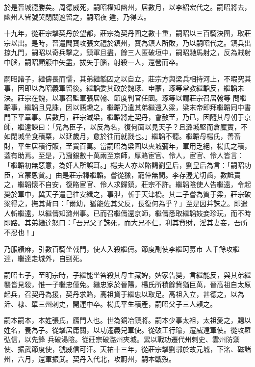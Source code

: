 \begin{pinyinscope}
 於是晉城德勝矣。周德威死，嗣昭權知幽州，居數月，以李紹宏代之。嗣昭將去，幽州人皆號哭閉關遮留之，嗣昭夜
 遁，乃得去。



 十九年，從莊宗擊契丹於望都，莊宗為契丹圍之數十重，嗣昭以三百騎決圍，取莊宗以出。是時，晉遣閻寶攻張文禮於鎮州，寶為鎮人所敗，乃以嗣昭代之。鎮兵出掠九門，嗣昭以奇兵擊之，鎮軍且盡，餘三人匿破垣中，嗣昭馳馬射之，反為賊射中腦，嗣昭顧箙中矢盡，拔矢于腦，射殺一人，還營而卒。



 嗣昭諸子，繼儔長而懦，其弟繼韜囚之以自立，莊宗方與梁兵相持河上，不暇究其事，因即以為昭義軍留後。繼韜委其政於魏琢、申蒙，琢等常教繼韜反，繼韜未決。莊宗在魏，以事召監軍張居翰、節度判官任圜。琢等以謂莊宗召居翰等
 問繼韜事，繼韜且見誅，因以語趣之，繼韜乃遣其弟繼遠入梁，梁末帝即拜繼韜同中書門下平章事。居數月，莊宗滅梁，繼韜將走契丹，會赦至，乃已，因隨其母朝于京師，繼遠諫曰：「兄為臣子，以反為名，復何面以見天子？且潞城堅而倉廩實，不如閉城坐食積粟，以延歲月，愈於往而就戮也。」繼韜不聽。繼韜母楊氏，善畜財，平生居積行販，至貲百萬。當嗣昭為梁圍以夾城彌年，軍用乏絕，楊氏之積，蓋有助焉。至是，乃齎銀數十萬兩至京師，厚賂宦官、伶人，宦官、伶人皆言：「繼韜初無惡意，為奸人所誤耳。」楊夫人亦以賂謁劉皇后，劉皇后為言：「嗣昭功
 臣，宜蒙恩貸。」由是莊宗釋繼韜。嘗從獵，寵倖無間。李存渥尤切齒，數詆責之，繼韜懷不自安，復賂宦官、伶人求歸鎮，莊宗不許。繼韜陰使人告繼遠，令起變於軍中，冀天子遣己往安緝之，事泄，斬于天津橋。其二子嘗為質于梁，莊宗破梁得之，撫其背曰：「爾幼，猶能佐其父反，長復何為乎？」至是因并誅之。即遣人斬繼遠，以繼儔知潞州事。已而召繼儔還京師，繼儔悉取繼韜妓妾珍玩，而不時即路。其弟繼達怒曰：「吾兄父子誅死，而大兄不仁，利其貲財，淫其妻妾，吾所不忍也！」



 乃服縗麻，引數百騎坐戟門，使人入殺繼儔。節度副使李繼珂募市
 人千餘攻繼達，繼達走城外，自剄死。



 嗣昭七子，至明宗時，子繼能坐笞殺其母主藏婢，婢家告變，言繼能反，與其弟繼襲皆見殺，惟一子繼忠僅免。繼忠家於晉陽，楊氏所積餘貲猶巨萬，晉高祖自太原起兵，召契丹為援，契丹求賂，高祖貸于繼忠以取足。高祖入立，甚德之，以為沂、棣、單三州刺史，開運中卒。楊氏平生積產，嗣昭父子三人賴之。



 嗣本嗣本，本姓張氏，鴈門人也。世為銅冶鎮將。嗣本少事太祖，太祖愛之，賜以姓名，養為子。從擊居庸關，以功遷義兒軍使。從破王行瑜，遷威遠軍使。從攻羅弘信，以先鋒
 兵破湯陰。從莊宗破潞州夾城。累以戰功遷代州刺史、雲州防禦使、振武節度使，號威信可汗。天祐十三年，從莊宗擊劉鄩於故元城，下洺、磁諸州，六月，還軍振武。契丹入代北，攻蔚州，嗣本戰歿。




\end{pinyinscope}
